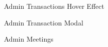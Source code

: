 \begin{figure}[H]
	\begin{center}
		\caption{Admin Transactions Hover Effect}
	\end{center}
\end{figure}

\begin{figure}[H]
	\begin{center}
		\caption{Admin Transaction Modal}
		\label{create}
	\end{center}
\end{figure}

\begin{figure}[H]
	\begin{center}
		\caption{Admin Meetings}
		\label{create}
	\end{center}
\end{figure}

